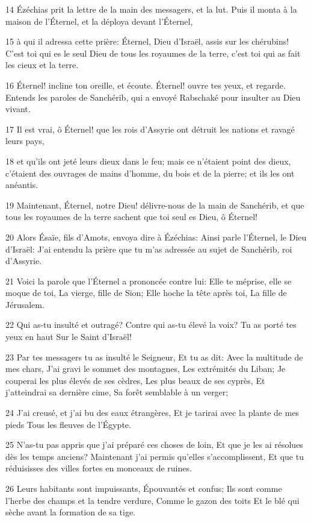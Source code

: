 \par 14 Ézéchias prit la lettre de la main des messagers, et la lut. Puis il monta à la maison de l'Éternel, et la déploya devant l'Éternel,
\par 15 à qui il adressa cette prière: Éternel, Dieu d'Israël, assis sur les chérubins! C'est toi qui es le seul Dieu de tous les royaumes de la terre, c'est toi qui as fait les cieux et la terre.
\par 16 Éternel! incline ton oreille, et écoute. Éternel! ouvre tes yeux, et regarde. Entends les paroles de Sanchérib, qui a envoyé Rabschaké pour insulter au Dieu vivant.
\par 17 Il est vrai, ô Éternel! que les rois d'Assyrie ont détruit les nations et ravagé leurs pays,
\par 18 et qu'ils ont jeté leurs dieux dans le feu; mais ce n'étaient point des dieux, c'étaient des ouvrages de mains d'homme, du bois et de la pierre; et ils les ont anéantis.
\par 19 Maintenant, Éternel, notre Dieu! délivre-nous de la main de Sanchérib, et que tous les royaumes de la terre sachent que toi seul es Dieu, ô Éternel!
\par 20 Alors Ésaïe, fils d'Amots, envoya dire à Ézéchias: Ainsi parle l'Éternel, le Dieu d'Israël: J'ai entendu la prière que tu m'as adressée au sujet de Sanchérib, roi d'Assyrie.
\par 21 Voici la parole que l'Éternel a prononcée contre lui: Elle te méprise, elle se moque de toi, La vierge, fille de Sion; Elle hoche la tête après toi, La fille de Jérusalem.
\par 22 Qui as-tu insulté et outragé? Contre qui as-tu élevé la voix? Tu as porté tes yeux en haut Sur le Saint d'Israël!
\par 23 Par tes messagers tu as insulté le Seigneur, Et tu as dit: Avec la multitude de mes chars, J'ai gravi le sommet des montagnes, Les extrémités du Liban; Je couperai les plus élevés de ses cèdres, Les plus beaux de ses cyprès, Et j'atteindrai sa dernière cime, Sa forêt semblable à un verger;
\par 24 J'ai creusé, et j'ai bu des eaux étrangères, Et je tarirai avec la plante de mes pieds Tous les fleuves de l'Égypte.
\par 25 N'as-tu pas appris que j'ai préparé ces choses de loin, Et que je les ai résolues dès les temps anciens? Maintenant j'ai permis qu'elles s'accomplissent, Et que tu réduisisses des villes fortes en monceaux de ruines.
\par 26 Leurs habitants sont impuissants, Épouvantés et confus; Ils sont comme l'herbe des champs et la tendre verdure, Comme le gazon des toits Et le blé qui sèche avant la formation de sa tige.
